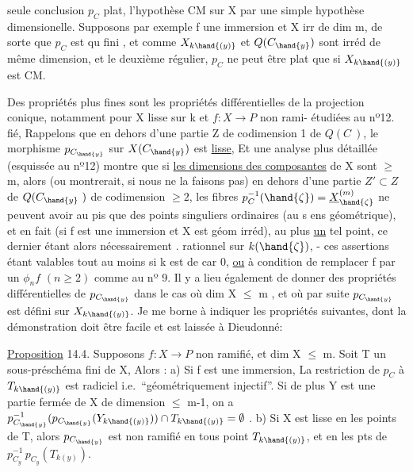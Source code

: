 seule conclusion $p_C$ plat, l'hypothèse CM sur X par une simple hypothèse
dimensionelle. Supposons par exemple f une immersion et X irr de dim m,
de sorte que $p_C$ est qu fini , et comme $X_{k\hand{(y)}}$ et $Q(C_{\hand{y}})$ sont irréd de
même dimension,  et le deuxième régulier, $p_C$ ne peut être
plat que si $X_{k\hand{(y)}}$ est CM.

Des propriétés plus fines sont les propriétés différentielles de
la projection conique, notamment pour X lisse sur k et $f:X\longrightarrow P$ non rami-%
étudiées au nº12.
fié,  Rappelons que 
en dehors d'une partie Z de codimension 1 de $Q(C\ )$, le morphisme
$p_{C_{\hand{y}}}$ sur $X(C_{\hand{y}})$ est \uline{lisse}, Et une analyse plus détaillée (esquissée au nº12) montre
que si \uline{les dimensions des composantes} de X sont $\geq$ m, alors\hand{)}
(ou montrerait, si nous ne la faisons pas)  en dehors d'une partie $Z'\subset Z$
de $Q(C_{\hand{y}}\ )$ de codimension $\geq 2$, les fibres $p_C^{-1}(\hand{\zeta}) = \underline{X}^{(m)}_{\hand{\zeta}}$ ne peuvent
avoir au pis que des points  singuliers ordinaires (au s ens
géométrique), et en fait (si f est une immersion et X est géom irréd),
 au plus \uline{un} tel point, ce dernier étant alors  nécessairement  .
rationnel sur $k(\hand{\zeta})$, - ces assertions étant valables tout au moins si
k est de car 0, \uline{ou} à condition de remplacer f par un $\phi_n f$ $(n\geq 2)$ comme
au nº 9. Il y a lieu également de donner des propriétés différentielles
de $p_{C_{\hand{y}}}$ dans le cas où dim X $\leqslant$ m , et où par suite $p_{C_{\hand{y}}}$ est défini sur $X_{k\hand{(y)}}$.
Je me borne à indiquer les propriétés suivantes, dont la démonstration
doit être facile et est laissée à Dieudonné:

\uline{Proposition} 14.4. Supposons $f:X\longrightarrow P$ non ramifié, et dim X $\leqslant$ m.
Soit T un sous-préschéma fini de X, Alors :
 a) Si f est une immersion, La restriction de $p_C$ à $T_{k\hand{(y)}}$ est  radiciel i.e.\ ``géométriquement injectif''. Si de
plus Y est une partie fermée de X de dimension $\leqslant$ m-1, on a
$p_{C_{\hand{y}}}^{-1}(p_{C_{\hand{y}}}(Y_{k\hand{(y)}})) \cap T_{k\hand{(y)}} = \emptyset$ .
b) Si X est lisse en les points de T, alors $p_{C_{\hand{y}}}$ est non ramifié
en tous point  $T_{k\hand{(y)}}$,  et  en les pts de $p_{C_y}^{-1}\,p_{C_y}(T_{k(y)})$.
